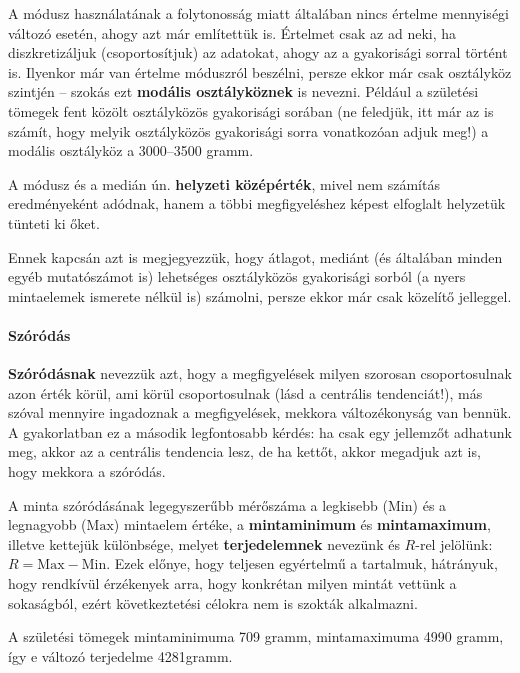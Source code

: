 \documentclass[]{book}
\let\oldparagraph\paragraph
\renewcommand{\paragraph}[1]{\oldparagraph{#1}\mbox{}}
\begin{document}
A módusz használatának a folytonosság miatt általában nincs értelme mennyiségi változó esetén, ahogy azt már említettük is. Értelmet csak az ad neki, ha diszkretizáljuk (csoportosítjuk) az adatokat, ahogy az a gyakorisági sorral történt is. Ilyenkor már van értelme móduszról beszélni, persze ekkor már csak osztályköz szintjén -- szokás ezt \textbf{modális osztályköznek} is nevezni. Például a születési tömegek fent közölt osztályközös gyakorisági sorában (ne feledjük, itt már az is számít, hogy melyik osztályközös gyakorisági sorra vonatkozóan adjuk meg!) a modális osztályköz a 3000--3500 gramm.

A módusz és a medián ún. \textbf{helyzeti középérték}, mivel nem számítás eredményeként adódnak, hanem a többi megfigyeléshez képest elfoglalt helyzetük tünteti ki őket.

Ennek kapcsán azt is megjegyezzük, hogy átlagot, mediánt (és általában minden egyéb mutatószámot is) lehetséges osztályközös gyakorisági sorból (a nyers mintaelemek ismerete nélkül is) számolni, persze ekkor már csak közelítő jelleggel.

\hypertarget{deskriptivmennyegyvaltanalitikusmutatoszamokszorodas}{%
\paragraph{Szóródás}\label{deskriptivmennyegyvaltanalitikusmutatoszamokszorodas}}

\textbf{Szóródásnak} nevezzük azt, hogy a megfigyelések milyen szorosan csoportosulnak azon érték körül, ami körül csoportosulnak (lásd a centrális tendenciát!), más szóval mennyire ingadoznak a megfigyelések, mekkora változékonyság van bennük. A gyakorlatban ez a második legfontosabb kérdés: ha csak egy jellemzőt adhatunk meg, akkor az a centrális tendencia lesz, de ha kettőt, akkor megadjuk azt is, hogy mekkora a szóródás.

A minta szóródásának legegyszerűbb mérőszáma a legkisebb (\(\mathrm{Min}\)) és a legnagyobb (\(\mathrm{Max}\)) mintaelem értéke, a \textbf{mintaminimum} és \textbf{mintamaximum}, illetve kettejük különbsége, melyet \textbf{terjedelemnek} nevezünk és \(R\)-rel jelölünk: \(R=\mathrm{Max}-\mathrm{Min}\). Ezek előnye, hogy teljesen egyértelmű a tartalmuk, hátrányuk, hogy rendkívül érzékenyek arra, hogy konkrétan milyen mintát vettünk a sokaságból, ezért következtetési célokra nem is szokták alkalmazni.

A születési tömegek mintaminimuma 709 gramm, mintamaximuma 4990 gramm, így e változó terjedelme 4281gramm.
\end{document}
